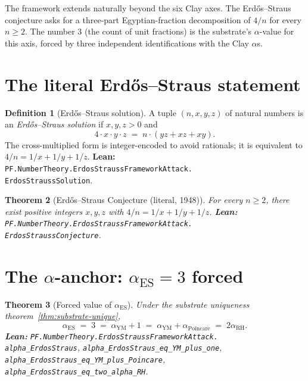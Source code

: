 \documentclass[11pt,a4paper]{article}
\theoremstyle{plain}
\newtheorem{theorem}{Theorem}[section]
\theoremstyle{definition}
\newtheorem{definition}[theorem]{Definition}
\begin{document}
The framework extends naturally beyond the six Clay axes. The
Erd\H{o}s--Straus conjecture asks for a three-part Egyptian-fraction
decomposition of $4/n$ for every $n \ge 2$. The number 3 (the count of
unit fractions) is the substrate's $\alpha$-value for this axis,
forced by three independent identifications with the Clay $\alpha$s.

\section{The literal Erd\H{o}s--Straus statement}
\label{sec:literal}

\begin{definition}[Erd\H{o}s--Straus solution]
A tuple $(n, x, y, z)$ of natural numbers is an
\emph{Erd\H{o}s--Straus solution} if $x, y, z > 0$ and
\[
4 \cdot x \cdot y \cdot z
\;=\;
n \cdot (y z + x z + x y).
\]
The cross-multiplied form is integer-encoded to avoid rationals; it is
equivalent to $4/n = 1/x + 1/y + 1/z$.
\textbf{Lean:}
\texttt{PF.NumberTheory.ErdosStraussFrameworkAttack.\\
ErdosStraussSolution}.
\end{definition}

\begin{theorem}[Erd\H{o}s--Straus Conjecture (literal, 1948)]
\label{thm:es-literal}
For every $n \ge 2$, there exist positive integers $x, y, z$ with
$4/n = 1/x + 1/y + 1/z$.
\textbf{Lean:}
\texttt{PF.NumberTheory.ErdosStraussFrameworkAttack.\\
ErdosStraussConjecture}.
\end{theorem}

\section{The $\alpha$-anchor: $\alpha_{\mathrm{ES}} = 3$ forced}
\label{sec:alpha}

\begin{theorem}[Forced value of $\alpha_{\mathrm{ES}}$]
\label{thm:es-alpha}
Under the substrate uniqueness theorem~\ref{thm:substrate-unique},
\[
\alpha_{\mathrm{ES}}
\;=\; 3
\;=\; \alpha_{\mathrm{YM}} + 1
\;=\; \alpha_{\mathrm{YM}} + \alpha_{\mathrm{Poincar\acute e}}
\;=\; 2 \alpha_{\mathrm{RH}}.
\]
\textbf{Lean:}
\texttt{PF.NumberTheory.ErdosStraussFrameworkAttack.\\
alpha\_ErdosStraus},
\texttt{alpha\_ErdosStraus\_eq\_YM\_plus\_one},
\texttt{alpha\_ErdosStraus\_eq\_YM\_plus\_Poincare},
\texttt{alpha\_ErdosStraus\_eq\_two\_alpha\_RH}.
\end{theorem}
\end{document}
